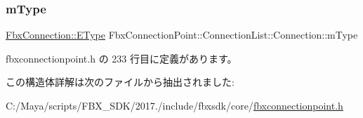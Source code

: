 \subsubsection{\texorpdfstring{m\+Type}{mType}}
{\footnotesize\ttfamily \hyperlink{class_fbx_connection_a3df448a5db356652ab99fd2be2553749}{Fbx\+Connection\+::\+E\+Type} Fbx\+Connection\+Point\+::\+Connection\+List\+::\+Connection\+::m\+Type}



 fbxconnectionpoint.\+h の 233 行目に定義があります。



この構造体詳解は次のファイルから抽出されました\+:\begin{DoxyCompactItemize}
\item 
C\+:/\+Maya/scripts/\+F\+B\+X\+\_\+\+S\+D\+K/2017./include/fbxsdk/core/\hyperlink{fbxconnectionpoint_8h}{fbxconnectionpoint.\+h}\end{DoxyCompactItemize}
